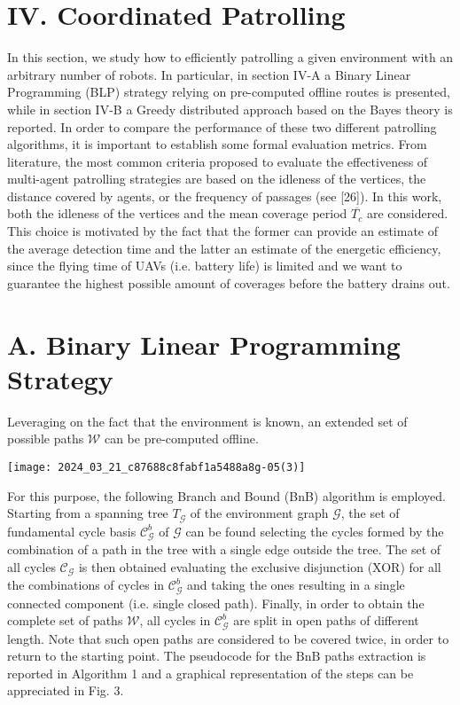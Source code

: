 \documentclass[conference]{IEEEtran}
\begin{document}
\section*{IV. Coordinated Patrolling}
In this section, we study how to efficiently patrolling a given environment with an arbitrary number of robots. In particular, in section IV-A a Binary Linear Programming (BLP) strategy relying on pre-computed offline routes is presented, while in section IV-B a Greedy distributed approach based on the Bayes theory is reported. In order to compare the performance of these two different patrolling algorithms, it is important to establish some formal evaluation metrics. From literature, the most common criteria proposed to evaluate the effectiveness of multi-agent patrolling strategies are based on the idleness of the vertices, the distance covered by agents, or the frequency of passages (see [26]). In this work, both the idleness of the vertices and the mean coverage period $\overline{T_{c}}$ are considered. This choice is motivated by the fact that the former can provide an estimate of the average detection time and the latter an estimate of the energetic efficiency, since the flying time of UAVs (i.e. battery life) is limited and we want to guarantee the highest possible amount of coverages before the battery drains out.

\section*{A. Binary Linear Programming Strategy}
Leveraging on the fact that the environment is known, an extended set of possible paths $\mathcal{W}$ can be pre-computed offline.

\begin{center}
\texttt{[image: 2024\_03\_21\_c87688c8fabf1a5488a8g-05(3)]}
\end{center}

For this purpose, the following Branch and Bound (BnB) algorithm is employed. Starting from a spanning tree $T_{\mathcal{G}}$ of the environment graph $\mathcal{G}$, the set of fundamental cycle basis $\mathcal{C}_{\mathcal{G}}^{b}$ of $\mathcal{G}$ can be found selecting the cycles formed by the combination of a path in the tree with a single edge outside the tree. The set of all cycles $\mathcal{C}_{\mathcal{G}}$ is then obtained evaluating the exclusive disjunction (XOR) for all the combinations of cycles in $\mathcal{C}_{\mathcal{G}}^{b}$ and taking the ones resulting in a single connected component (i.e. single closed path). Finally, in order to obtain the complete set of paths $\mathcal{W}$, all cycles in $\mathcal{C}_{\mathcal{G}}^{b}$ are split in open paths of different length. Note that such open paths are considered to be covered twice, in order to return to the starting point. The pseudocode for the $\mathrm{BnB}$ paths extraction is reported in Algorithm 1 and a graphical representation of the steps can be appreciated in Fig. 3.
\end{document}
